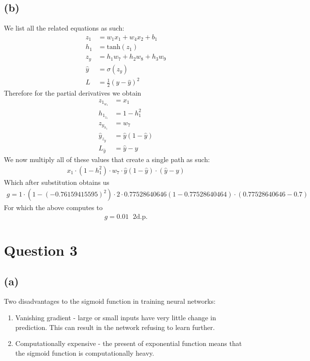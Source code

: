 \documentclass[a4paper]{article}
\theoremstyle{plain}
\theoremstyle{definition}
\theoremstyle{remark}
\begin{document}
\subsection{(b)}
We list all the related equations as such:
\begin{align*}
	z_1 &= w_1x_1 + w_4x_2 + b_1 \\
	h_1 &= \text{tanh}(z_1) \\
	z_y &= h_1w_7 + h_2w_8 + h_3w_9\\
	\hat{y} &= \sigma(z_y) \\
	L &= \frac{1}{2}\left( y-\hat{y} \right) ^2
\end{align*}
Therefore for the partial derivatives we obtain
\begin{align*}
	z_{1}_{w_1} &= x_1 \\
	h_{1}_{z_1} &= 1-h_1^2 \\
	z_{y}_{h_1} &= w_7 \\
	\hat{y}_{z_{y}} &= \hat{y}\left( 1-\hat{y} \right) \\
	L_{\hat{y}} &= \hat{y} - y
\end{align*}
We now multiply all of these values that create a single path as such:
\begin{align*}
	x_1 \cdot (1-h_1^2) \cdot w_7 \cdot \hat{y}(1-\hat{y}) \cdot (\hat{y} -y)
\end{align*}
Which after substitution obtains us
\begin{align*}
	g = 1 \cdot (1-(-0.76159415595)^2)\cdot 2 \cdot 0.77528640646(1-0.77528640464)\cdot(0.77528640646-0.7)
\end{align*}
For which the above computes to
\begin{align*}
	g= 0.01 \; \text{ 2d.p.}
\end{align*}
\newpage
\section{Question 3}
\subsection{(a)}
Two disadvantages to the sigmoid function in training neural networks:
\begin{enumerate}
	\item Vanishing gradient - large or small inputs have very little change in prediction. This can result in the network refusing to learn further.
	\item Computationally expensive - the present of exponential function means that the sigmoid function is computationally heavy.
\end{enumerate}
\end{document}
